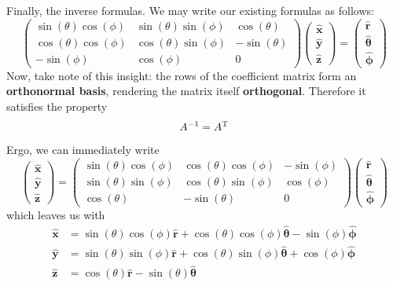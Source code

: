 \documentclass[a4paper]{article}
\begin{document}
Finally, the inverse formulas. We may write our existing formulas as follows:
\[
	\begin{pmatrix}
		\sin\!\left(\theta\right)\cos\!\left(\phi\right) & \sin\!\left(\theta\right)\sin\!\left(\phi\right) & \cos\!\left(\theta\right) \\
		\cos\!\left(\theta\right)\cos\!\left(\phi\right) & \cos\!\left(\theta\right)\sin\!\left(\phi\right) & -\sin\!\left(\theta\right) \\
		-\sin\!\left(\phi\right) & \cos\!\left(\phi\right) & 0
	\end{pmatrix} 
	\begin{pmatrix}
		\pmb{\hat{x}} \\
		\pmb{\hat{y}} \\
		\pmb{\hat{z}}
	\end{pmatrix}
	=
	\begin{pmatrix}
		\pmb{\hat{r}} \\
		\pmb{\hat{\theta}} \\
		\pmb{\hat{\phi}}
	\end{pmatrix}
\]
Now, take note of this insight: the rows of the coefficient matrix form an \textbf{orthonormal basis}, rendering the matrix itself \textbf{orthogonal}. Therefore it satisfies the property
\[
	A^{-1} = A^{\textsc{T}} 
\]
Ergo, we can immediately write
\[
	\begin{pmatrix}
		\pmb{\hat{x}} \\
		\pmb{\hat{y}} \\
		\pmb{\hat{z}}
	\end{pmatrix}
	=
	\begin{pmatrix}
		\sin\!\left(\theta\right)\cos\!\left(\phi\right) & \cos\!\left(\theta\right)\cos\!\left(\phi\right) & -\sin\!\left(\phi\right) \\
		\sin\!\left(\theta\right)\sin\!\left(\phi\right) & \cos\!\left(\theta\right)\sin\!\left(\phi\right) & \cos\!\left(\phi\right) \\
		\cos\!\left(\theta\right) & -\sin\!\left(\theta\right) & 0
	\end{pmatrix}
	\begin{pmatrix}
		\pmb{\hat{r}} \\
		\pmb{\hat{\theta}} \\
		\pmb{\hat{\phi}}
	\end{pmatrix}
\]
which leaves us with
\begin{align*}
	\pmb{\hat{x}} & = \sin\!\left(\theta\right)\cos\!\left(\phi\right)\pmb{\hat{r}} + \cos\!\left(\theta\right)\cos\!\left(\phi\right)\pmb{\hat{\theta}} - \sin\!\left(\phi\right)\pmb{\hat{\phi}} \\
	\pmb{\hat{y}} & = \sin\!\left(\theta\right)\sin\!\left(\phi\right)\pmb{\hat{r}} + \cos\!\left(\theta\right)\sin\!\left(\phi\right)\pmb{\hat{\theta}} + \cos\!\left(\phi\right)\pmb{\hat{\phi}} \\ 
	\pmb{\hat{z}} & = \cos\!\left(\theta\right)\pmb{\hat{r}} - \sin\!\left(\theta\right)\pmb{\hat{\theta}}
\end{align*}
\end{document}
